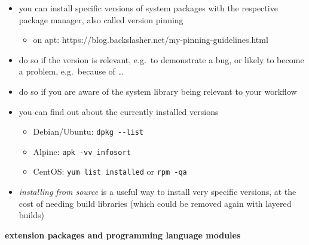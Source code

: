 \documentclass[10pt,letterpaper]{article}
\providecommand{\tightlist}{%
  \setlength{\itemsep}{0pt}\setlength{\parskip}{0pt}}
\begin{document}
\begin{itemize}
\tightlist
\item
  you can install specific versions of system packages with the
  respective package manager, also called version pinning

  \begin{itemize}
  \tightlist
  \item
    on apt: https://blog.backslasher.net/my-pinning-guidelines.html
  \end{itemize}
\item
  do so if the version is relevant, e.g.~to demonstrate a bug, or likely
  to become a problem, e.g.~because of \ldots{}
\item
  do so if you are aware of the system library being relevant to your
  workflow
\item
  you can find out about the currently installed versions

  \begin{itemize}
  \tightlist
  \item
    Debian/Ubuntu: \texttt{dpkg\ -\/-list}
  \item
    Alpine: \texttt{apk\ -vv\ info\textbar{}sort}
  \item
    CentOS: \texttt{yum\ list\ installed} or \texttt{rpm\ -qa}
  \end{itemize}
\item
  \emph{installing from source} is a useful way to install very specific
  versions, at the cost of needing build libraries (which could be
  removed again with layered builds)
\end{itemize}

\textbf{extension packages and programming language modules}
\end{document}
